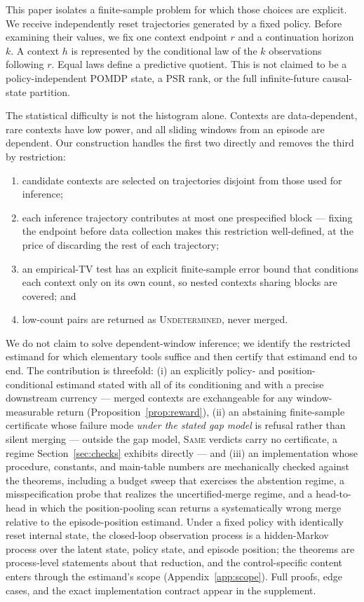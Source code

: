 \documentclass{article}
\begin{document}
This paper isolates a finite-sample problem for which those choices are
explicit.  We receive independently reset trajectories generated by a fixed
policy.  Before examining their values, we fix one context endpoint $r$ and a
continuation horizon $k$.  A context $h$ is represented by the conditional law
of the $k$ observations following $r$.  Equal laws define a predictive
quotient.  This is not claimed to be a policy-independent POMDP state, a PSR
rank, or the full infinite-future causal-state partition.

The statistical difficulty is not the histogram alone.  Contexts are
data-dependent, rare contexts have low power, and all sliding windows from an
episode are dependent.  Our construction handles the first two directly and
removes the third by restriction:

\begin{enumerate}
  \item candidate contexts are selected on trajectories disjoint from those
  used for inference;
  \item each inference trajectory contributes at most one prespecified block
  --- fixing the endpoint before data collection makes this restriction
  well-defined, at the price of discarding the rest of each trajectory;
  \item an empirical-TV test has an explicit finite-sample error bound that
  conditions each context only on its own count, so nested contexts sharing
  blocks are covered; and
  \item low-count pairs are returned as \textsc{Undetermined}, never merged.
\end{enumerate}

We do not claim to solve dependent-window inference; we identify the
restricted estimand for which elementary tools suffice and then certify that
estimand end to end.  The contribution is threefold: (i) an explicitly
policy- and position-conditional estimand stated with all of its
conditioning and with a precise downstream currency --- merged contexts are
exchangeable for any window-measurable return
(Proposition~\ref{prop:reward}), (ii) an abstaining finite-sample
certificate whose failure mode \emph{under the stated gap model} is refusal
rather than silent merging --- outside the gap model, \textsc{Same} verdicts
carry no certificate, a regime Section~\ref{sec:checks} exhibits directly
--- and (iii) an implementation
whose procedure, constants, and main-table numbers are mechanically checked
against the theorems, including a budget sweep that exercises the abstention
regime, a misspecification probe that realizes the uncertified-merge regime,
and a head-to-head in which the position-pooling scan returns a
systematically wrong merge relative to the episode-position estimand.  Under a fixed policy with identically reset internal state, the
closed-loop observation process is a hidden-Markov process over the latent
state, policy state, and episode position; the theorems are process-level
statements about that reduction, and the control-specific content enters
through the estimand's scope (Appendix~\ref{app:scope}).  Full proofs, edge
cases, and the exact implementation contract appear in the supplement.
\end{document}
